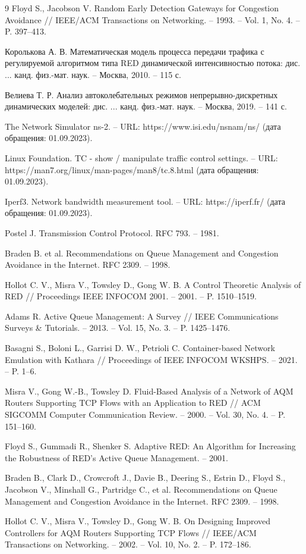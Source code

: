 \documentclass[10pt, conference, twocolumn, a4paper]{article}
\begin{document}
\begin{thebibliography}{9}
Floyd S., Jacobson V. Random Early Detection Gateways for Congestion Avoidance // IEEE/ACM Transactions on Networking. -- 1993. -- Vol. 1, No. 4. -- P. 397--413.

Королькова А. В. Математическая модель процесса передачи трафика с регулируемой алгоритмом типа RED динамической интенсивностью потока: дис. ... канд. физ.-мат. наук. -- Москва, 2010. -- 115 с.

Велиева Т. Р. Анализ автоколебательных режимов непрерывно-дискретных динамических моделей: дис. ... канд. физ.-мат. наук. -- Москва, 2019. -- 141 с.

The Network Simulator ns-2. -- URL: https://www.isi.edu/nsnam/ns/ (дата обращения: 01.09.2023).

Linux Foundation. TC - show / manipulate traffic control settings. -- URL: https://man7.org/linux/man-pages/man8/tc.8.html (дата обращения: 01.09.2023).

Iperf3. Network bandwidth measurement tool. -- URL: https://iperf.fr/ (дата обращения: 01.09.2023).

Postel J. Transmission Control Protocol. RFC 793. -- 1981.

Braden B. et al. Recommendations on Queue Management and Congestion Avoidance in the Internet. RFC 2309. -- 1998.

Hollot C. V., Misra V., Towsley D., Gong W. B. A Control Theoretic Analysis of RED // Proceedings IEEE INFOCOM 2001. -- 2001. -- P. 1510--1519.

Adams R. Active Queue Management: A Survey // IEEE Communications Surveys \& Tutorials. -- 2013. -- Vol. 15, No. 3. -- P. 1425--1476.

Basagni S., Boloni L., Garrisi D. W., Petrioli C. Container-based Network Emulation with Kathara // Proceedings of IEEE INFOCOM WKSHPS. -- 2021. -- P. 1--6.

Misra V., Gong W.-B., Towsley D. Fluid-Based Analysis of a Network of AQM Routers Supporting TCP Flows with an Application to RED // ACM SIGCOMM Computer Communication Review. -- 2000. -- Vol. 30, No. 4. -- P. 151--160.

Floyd S., Gummadi R., Shenker S. Adaptive RED: An Algorithm for Increasing the Robustness of RED's Active Queue Management. -- 2001.

Braden B., Clark D., Crowcroft J., Davie B., Deering S., Estrin D., Floyd S., Jacobson V., Minshall G., Partridge C., et al. Recommendations on Queue Management and Congestion Avoidance in the Internet. RFC 2309. -- 1998.

Hollot C. V., Misra V., Towsley D., Gong W. B. On Designing Improved Controllers for AQM Routers Supporting TCP Flows // IEEE/ACM Transactions on Networking. -- 2002. -- Vol. 10, No. 2. -- P. 172--186.
\end{thebibliography}
\end{document}
